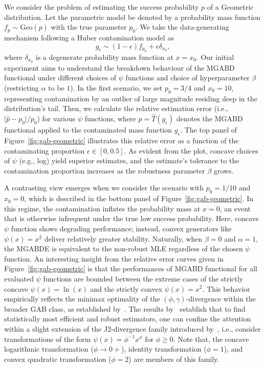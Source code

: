 \documentclass[11pt]{article}
\theoremstyle{plain}
\theoremstyle{remark}
\begin{document}
We consider the problem of estimating the success probability $p$ of a Geometric distribution. Let the parametric model be denoted by a probability mass function $f_p \sim \text{Geo}(p)$ with the true parameter $p_0$. We take the data-generating mechanism following a Huber contamination model as
\begin{equation*}
    g_\epsilon \sim (1-\epsilon)f_{p_0} + \epsilon \delta_{x_0},
\end{equation*}
\noindent where $\delta_{x_0}$ is a degenerate probability mass function at $x = x_0$. Our initial experiment aims to understand the breakdown behaviour of the MGABD functional under different choices of $\psi$ functions and choice of hyperparameter $\beta$ (restricting $\alpha$ to be $1$). In the first scenario, we set  $p_0 = 3/4$ and $x_0 = 10$, representing contamination by an outlier of large magnitude residing deep in the distribution's tail. Then, we calculate the relative estimation error (i.e., $\vert \hat{p} - p_0\vert / p_0$) for various $\psi$ functions, where $\hat{p} = \hat{T}(g_\epsilon)$ denotes the MGABD functional applied to the contaminated mass function $g_\epsilon$. The top panel of Figure~\ref{fig:gab-geometric} illustrates this relative error as a function of the contaminating proportion $\epsilon \in [0, 0.5]$. As evident from the plot, concave choices of $\psi$ (e.g., log) yield superior estimates, and the estimate's tolerance to the contamination proportion increases as the robustness parameter $\beta$ grows.

A contrasting view emerges when we consider the scenario with $p_0 = 1/10$ and $x_0 = 0$, which is described in the bottom panel of Figure~\ref{fig:gab-geometric}. In this regime, the contamination inflates the probability mass at $x = 0$, an event that is otherwise infrequent under the true low success probability. Here, concave $\psi$ function shows degrading performance; instead, convex generators like $\psi(x) = x^2$ deliver relatively greater stability. Naturally, when $\beta = 0$ and $\alpha = 1$, the MGABDE is equivalent to the non-robust MLE regardless of the chosen $\psi$ function. An interesting insight from the relative error curves given in Figure~\ref{fig:gab-geometric} is that the performances of MGABD functional for all evaluated $\psi$ functions are bounded between the extreme cases of the strictly concave $\psi(x) = \ln(x)$ and the strictly convex $\psi(x) = x^2$. This behavior empirically reflects the minimax optimality of the $(\phi,\gamma)$-divergence within the broader GAB class, as established by~\cite{roy2026gaboptimal}. The results by~\cite{roy2026gaboptimal} establish that to find statistically most efficient and robust estimators, one can confine the attention within a slight extension of the J2-divergence family introduced by~\cite{jones2001comparison}, i.e., consider transformations of the form $\psi(x) = \phi^{-1}x^\phi$ for $\phi \geq 0$. Note that, the concave logarithmic transformation ($\phi \to 0+$), identity transformation ($\phi = 1$), and convex quadratic transformation ($\phi = 2$) are members of this family.
\end{document}
